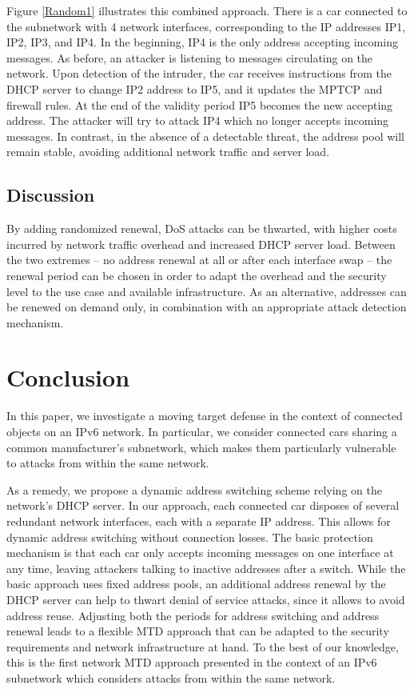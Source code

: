 Figure \ref{Random1} illustrates this
combined approach. There is a car connected to the subnetwork with 4
network interfaces, corresponding to the IP addresses IP1, IP2, IP3,
and IP4. In the beginning, IP4 is the only address accepting incoming
messages. As before, an attacker is listening to messages circulating
on the network. Upon detection of the intruder, the car receives
instructions from the DHCP server to change IP2 address to IP5, and it
updates the MPTCP and firewall rules. At the end of the validity
period IP5 becomes the new accepting address.  The attacker will try
to attack IP4 which no longer accepts incoming messages.  In contrast,
in the absence of a detectable threat, the address pool will remain
stable, avoiding additional network traffic and server load.

\subsection{Discussion} 

By adding randomized renewal, DoS attacks can be thwarted, with higher
costs incurred by network traffic overhead and increased DHCP server
load. Between the two extremes -- no address renewal at all or after
each interface swap -- the renewal period can be chosen in order to
adapt the overhead and the security level to the use case and
available infrastructure. As an alternative, addresses can be renewed
on demand only, in combination with an appropriate attack detection
mechanism.



\section{Conclusion}

\label{sec:con}

{\Huge I}n this paper, we investigate a moving target defense in the context of
connected objects on an IPv6 network. In particular, we consider connected cars
sharing a common manufacturer's subnetwork, which makes them particularly
vulnerable to attacks from within the same network. 

As a remedy, we propose a dynamic address switching scheme relying on the
network's DHCP server. In our approach, each connected car disposes of several
redundant network interfaces, each with a separate IP address. This allows for
dynamic address switching without connection losses. The basic protection
mechanism is that each car only accepts incoming messages on one interface at
any time, leaving attackers talking to inactive addresses after a switch. While
the basic approach uses fixed address pools, an additional address renewal by
the DHCP server can help to thwart denial of service attacks, since it allows to
avoid address reuse. Adjusting both the periods for address switching and
address renewal leads to a flexible MTD approach that can be adapted to the
security requirements and network infrastructure at hand. To the best of our
knowledge, this is the first network MTD approach presented in the context of an
IPv6 subnetwork which considers attacks from within the same network.

